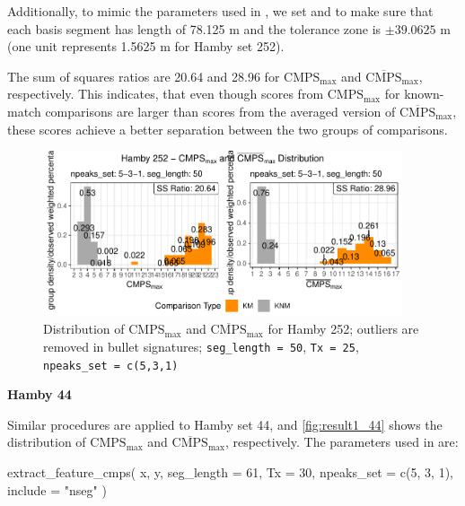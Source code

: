 Additionally, to mimic the parameters used in \citet{cmps}, we set
 and  to make sure that each basis
segment has length of 78.125 \textmu m and the tolerance zone is
\(\pm 39.0625\) \textmu m (one unit represents 1.5625 \textmu m for
Hamby set 252).

The sum of squares ratios are 20.64 and 28.96 for
\(\mathrm{CMPS_{max}}\) and \(\mathrm{\overline{CMPS}_{max}}\),
respectively. This indicates, that even though scores from
\(\mathrm{CMPS_{max}}\) for known-match comparisons are larger than
scores from the averaged version of \(\mathrm{\overline{CMPS}_{max}}\),
these scores achieve a better separation between the two groups of
comparisons.

\begin{Schunk}
\begin{figure}

{\centering \includegraphics[width=400px]{ju-hofmann_files/figure-latex/result1_252-1} 

}

\caption{Distribution of $\mathrm{CMPS_{max}}$ and $\mathrm{\overline{CMPS}_{max}}$ for Hamby 252; outliers are removed in bullet signatures; \texttt{seg\_length = 50}, \texttt{Tx = 25}, \texttt{npeaks\_set = c(5,3,1)} }\label{fig:result1_252}
\end{figure}
\end{Schunk}

\textbf{Hamby 44}

Similar procedures are applied to Hamby set 44, and
\autoref{fig:result1_44} shows the distribution of
\(\mathrm{CMPS_{max}}\) and \(\mathrm{\overline{CMPS}_{max}}\),
respectively. The parameters used in  are:

\begin{Schunk}
\begin{Sinput}
extract_feature_cmps(
  x, y,
  seg_length = 61,
  Tx = 30,
  npeaks_set = c(5, 3, 1),
  include = "nseg"
)
\end{Sinput}
\end{Schunk}

